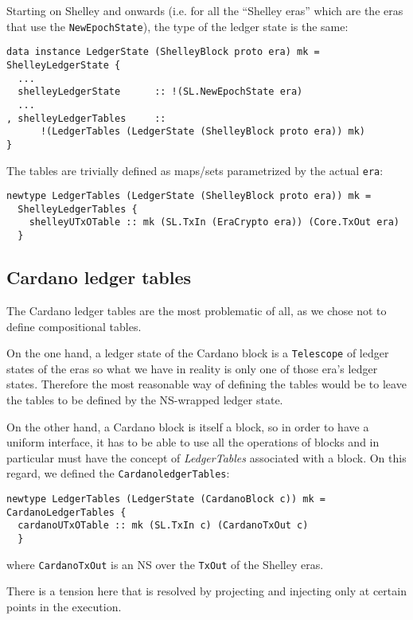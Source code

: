 \documentclass[11pt,a4paper]{article}
\theoremstyle{definition}
\begin{document}
Starting on Shelley and onwards (i.e. for all the ``Shelley eras'' which are the eras that use the \texttt{NewEpochState}), the type of the ledger state is the same:

\begin{lstlisting}
data instance LedgerState (ShelleyBlock proto era) mk = ShelleyLedgerState {
  ...
  shelleyLedgerState      :: !(SL.NewEpochState era)
  ...
, shelleyLedgerTables     ::
      !(LedgerTables (LedgerState (ShelleyBlock proto era)) mk)
}
\end{lstlisting}

The tables are trivially defined as maps/sets parametrized by the actual \texttt{era}:

\begin{lstlisting}
newtype LedgerTables (LedgerState (ShelleyBlock proto era)) mk =
  ShelleyLedgerTables {
    shelleyUTxOTable :: mk (SL.TxIn (EraCrypto era)) (Core.TxOut era)
  }
\end{lstlisting}

\subsection{Cardano ledger tables}

The Cardano ledger tables are the most problematic of all, as we chose not to
define compositional tables.

On the one hand, a ledger state of the Cardano block is a \texttt{Telescope} of
ledger states of the eras so what we have in reality is only one of those era's
ledger states. Therefore the most reasonable way of defining the tables would be
to leave the tables to be defined by the NS-wrapped ledger state.

On the other hand, a Cardano block is itself a block, so in order to have a
uniform interface, it has to be able to use all the operations of blocks and in
particular must have the concept of \emph{LedgerTables} associated with a block.
On this regard, we defined the \texttt{CardanoledgerTables}:

\begin{lstlisting}
newtype LedgerTables (LedgerState (CardanoBlock c)) mk = CardanoLedgerTables {
  cardanoUTxOTable :: mk (SL.TxIn c) (CardanoTxOut c)
  }
\end{lstlisting}
where \texttt{CardanoTxOut} is an NS over the \texttt{TxOut} of the Shelley
eras.

There is a tension here that is resolved by projecting and injecting only at
certain points in the execution.
\end{document}
